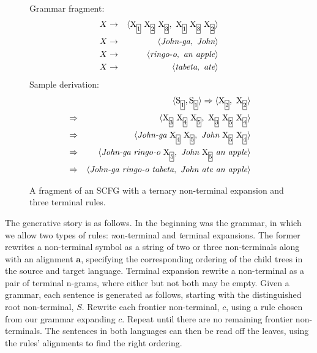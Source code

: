 \begin{figure}Grammar fragment:
\begin{eqnarray*}
\label{rule:discont}X & \rightarrow & \langle \nt{X}{1}\ \nt{X}{2}\ \nt{X}{3},\ \nt{X}{1}\ \nt{X}{3}\ \nt{X}{2} \rangle  \\
X & \rightarrow & \langle \textrm{\emph{John-ga}},\ \textrm{\emph{John}} \rangle  \\
X & \rightarrow & \langle \textrm{\emph{ringo-o}},\ \textrm{\emph{an apple}} \rangle  \\
X & \rightarrow & \langle \textrm{\emph{tabeta}},\ \textrm{\emph{ate}} \rangle
\end{eqnarray*}
Sample derivation:
\begin{eqnarray*}
\label{derivationt}
& &\langle \nt{S}{1},\nt{S}{1} \rangle \Rightarrow \langle \nt{X}{2},\ \nt{X}{2} \rangle \\
 & \Rightarrow&  \langle \nt{X}{3}\ \nt{X}{4}\ \nt{X}{5},\ \nt{X}{3}\ \nt{X}{5}\ \nt{X}{4} \rangle  \\
 & \Rightarrow &\langle \textrm{\emph{John-ga}}\ \nt{X}{4}\ \nt{X}{5},\ \textrm{\emph{John}}\ \nt{X}{5}\ \nt{X}{4} \rangle \\
 & \Rightarrow &\langle \textrm{\emph{John-ga}}\ \textrm{\emph{ringo-o}}\ \nt{X}{5},\ \textrm{\emph{John}}\ \nt{X}{5}\ \textrm{\emph{an apple}} \rangle \\
 & \Rightarrow &\langle \textrm{\emph{John-ga ringo-o tabeta}},\ \textrm{\emph{John ate an apple}} \rangle
\end{eqnarray*}
\caption{A fragment of an SCFG with a ternary non-terminal expansion and three terminal rules.}
\label{fig:scfg}
\end{figure}

The generative story is as follows. 
In the beginning was the grammar, in which we allow  two types of rules: {\emph non-terminal} and {\emph terminal} expansions. 
The former rewrites a non-terminal symbol as a string of two or three non-terminals along with an alignment $\mathbf{a}$, specifying the corresponding ordering of the child trees in the source and target language. 
Terminal expansion rewrite a non-terminal as a pair of terminal n-grams, where either but not both may be empty. 
Given a grammar, each sentence is generated as follows, starting with the distinguished root non-terminal, $S$. 
Rewrite each frontier non-terminal, $c$, using a rule chosen from our grammar expanding $c$. 
Repeat until there are no remaining frontier non-terminals. 
The sentences in both languages can then be read off the leaves, using the rules' alignments to find the right ordering. 


